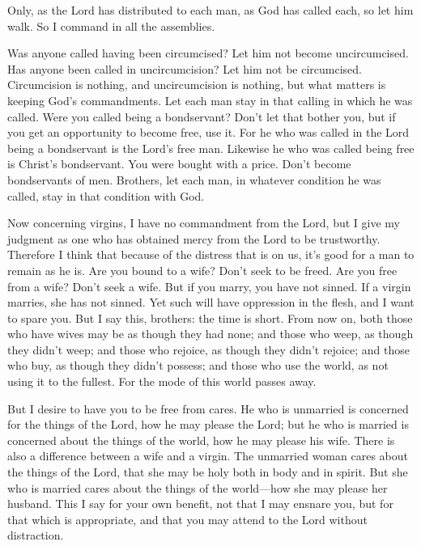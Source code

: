  Only, as the Lord has distributed to each man, as God has
called each, so let him walk. So I command in all the assemblies.

 Was anyone called having been circumcised? Let him not
become uncircumcised. Has anyone been called in uncircumcision? Let him
not be circumcised.  Circumcision is nothing, and
uncircumcision is nothing, but what matters is keeping God's
commandments.  Let each man stay in that calling in which
he was called.  Were you called being a bondservant? Don't
let that bother you, but if you get an opportunity to become free, use
it.  For he who was called in the Lord being a bondservant
is the Lord's free man. Likewise he who was called being free is
Christ's bondservant.  You were bought with a price. Don't
become bondservants of men.  Brothers, let each man, in
whatever condition he was called, stay in that condition with God.

 Now concerning virgins, I have no commandment from the
Lord, but I give my judgment as one who has obtained mercy from the Lord
to be trustworthy.  Therefore I think that because of the
distress that is on us, it's good for a man to remain as he is.
 Are you bound to a wife? Don't seek to be freed. Are you
free from a wife? Don't seek a wife.  But if you marry, you
have not sinned. If a virgin marries, she has not sinned. Yet such will
have oppression in the flesh, and I want to spare you.  But
I say this, brothers: the time is short. From now on, both those who
have wives may be as though they had none;  and those who
weep, as though they didn't weep; and those who rejoice, as though they
didn't rejoice; and those who buy, as though they didn't possess;
 and those who use the world, as not using it to the
fullest. For the mode of this world passes away.

 But I desire to have you to be free from cares. He who is
unmarried is concerned for the things of the Lord, how he may please the
Lord;  but he who is married is concerned about the things
of the world, how he may please his wife.  There is also a
difference between a wife and a virgin. The unmarried woman cares about
the things of the Lord, that she may be holy both in body and in spirit.
But she who is married cares about the things of the world---how she may
please her husband.  This I say for your own benefit, not
that I may ensnare you, but for that which is appropriate, and that you
may attend to the Lord without distraction.

